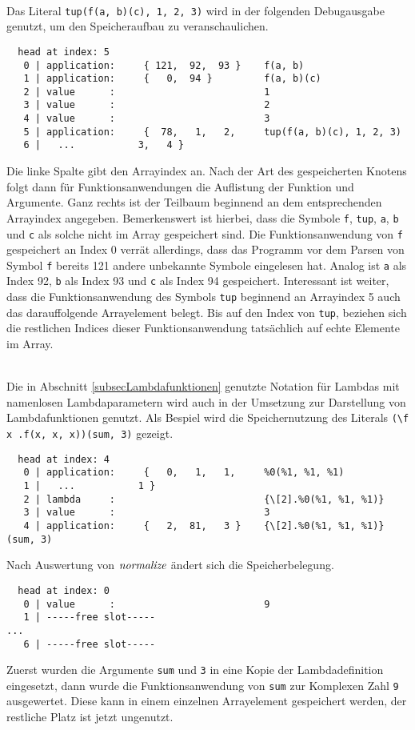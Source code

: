 \begin{beispiel}~\\ \label{bspREPLliteral}
Das Literal \verb|tup(f(a, b)(c), 1, 2, 3)| wird in der folgenden Debugausgabe genutzt, um den Speicheraufbau zu veranschaulichen.
\begin{verbatim}
  head at index: 5
   0 | application:     { 121,  92,  93 }    f(a, b)
   1 | application:     {   0,  94 }         f(a, b)(c)
   2 | value      :                          1
   3 | value      :                          2
   4 | value      :                          3
   5 | application:     {  78,   1,   2,     tup(f(a, b)(c), 1, 2, 3)
   6 |   ...           3,   4 }
\end{verbatim}
Die linke Spalte gibt den Arrayindex an. Nach der Art des gespeicherten Knotens folgt dann für Funktionsanwendungen die Auflistung der Funktion und Argumente. Ganz rechts ist der Teilbaum beginnend an dem entsprechenden Arrayindex angegeben. Bemerkenswert ist hierbei, dass die Symbole \verb|f|, \verb|tup|, \verb|a|, \verb|b| und \verb|c| als solche nicht im Array gespeichert sind. Die Funktionsanwendung von \verb|f| gespeichert an Index 0 verrät allerdings, dass das Programm vor dem Parsen von Symbol \verb|f| bereits 121 andere unbekannte Symbole eingelesen hat. Analog ist \verb|a| als Index 92, \verb|b| als Index 93 und \verb|c| als Index 94 gespeichert. 
Interessant ist weiter, dass die Funktionsanwendung des Symbols \verb|tup| beginnend an Arrayindex 5 auch das darauffolgende Arrayelement belegt. Bis auf den Index von \verb|tup|, beziehen sich die restlichen Indices dieser Funktionsanwendung tatsächlich auf echte Elemente im Array. 
\end{beispiel}


\begin{beispiel}~\\ \label{bspREPLlambda}
Die in Abschnitt \ref{subsecLambdafunktionen} genutzte Notation für Lambdas mit namenlosen Lambdaparametern wird auch in der Umsetzung zur Darstellung von Lambdafunktionen genutzt. Als Bespiel wird die Speichernutzung des Literals \verb|(\f x .f(x, x, x))(sum, 3)| gezeigt.
\begin{verbatim}
  head at index: 4
   0 | application:     {   0,   1,   1,     %0(%1, %1, %1)
   1 |   ...           1 }
   2 | lambda     :                          {\[2].%0(%1, %1, %1)}
   3 | value      :                          3
   4 | application:     {   2,  81,   3 }    {\[2].%0(%1, %1, %1)}(sum, 3)
\end{verbatim}
Nach Auswertung von $\mathit{normalize}$ ändert sich die Speicherbelegung.
\begin{verbatim}
  head at index: 0
   0 | value      :                          9
   1 | -----free slot-----
...
   6 | -----free slot-----
\end{verbatim}
Zuerst wurden die Argumente \verb|sum| und \verb|3| in eine Kopie der Lambdadefinition eingesetzt, dann wurde die Funktionsanwendung von \verb|sum| zur Komplexen Zahl \verb|9| ausgewertet. Diese kann in einem einzelnen Arrayelement gespeichert werden, der restliche Platz ist jetzt ungenutzt.
\end{beispiel}





